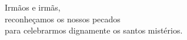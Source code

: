 Irmãos e irmãs, \\ reconheçamos os nossos pecados \\ para celebrarmos dignamente os santos mistérios.
\vspace{.2cm} \\
